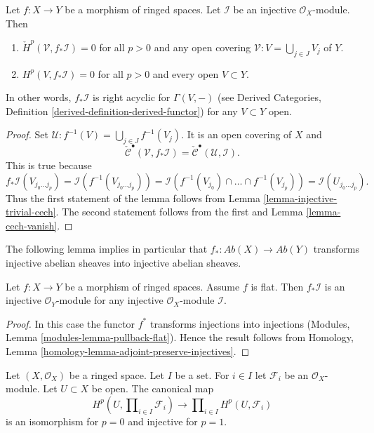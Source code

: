 \begin{lemma}
\label{lemma-pushforward-injective}
Let $f : X \to Y$ be a morphism of ringed spaces.
Let $\mathcal{I}$ be an injective $\mathcal{O}_X$-module.
Then
\begin{enumerate}
\item $\check{H}^p(\mathcal{V}, f_*\mathcal{I}) = 0$
for all $p > 0$ and any open covering
$\mathcal{V} : V = \bigcup_{j \in J} V_j$ of $Y$.
\item $H^p(V, f_*\mathcal{I}) = 0$ for all $p > 0$ and
every open $V \subset Y$.
\end{enumerate}
In other words, $f_*\mathcal{I}$ is right acyclic for $\Gamma(V, -)$
(see
Derived Categories, Definition \ref{derived-definition-derived-functor})
for any $V \subset Y$ open.
\end{lemma}

\begin{proof}
Set $\mathcal{U} : f^{-1}(V) = \bigcup_{j \in J} f^{-1}(V_j)$.
It is an open covering of $X$ and
$$
\check{\mathcal{C}}^\bullet(\mathcal{V}, f_*\mathcal{I}) =
\check{\mathcal{C}}^\bullet(\mathcal{U}, \mathcal{I}).
$$
This is true because
$$
f_*\mathcal{I}(V_{j_0 \ldots j_p})
= \mathcal{I}(f^{-1}(V_{j_0 \ldots j_p})) =
\mathcal{I}(f^{-1}(V_{j_0}) \cap \ldots \cap f^{-1}(V_{j_p}))
= \mathcal{I}(U_{j_0 \ldots j_p}).
$$
Thus the first statement of the lemma follows from
Lemma \ref{lemma-injective-trivial-cech}. The second statement
follows from the first and Lemma \ref{lemma-cech-vanish}.
\end{proof}

\noindent
The following lemma implies in particular that
$f_* : \textit{Ab}(X) \to \textit{Ab}(Y)$ transforms injective
abelian sheaves into injective abelian sheaves.

\begin{lemma}
\label{lemma-pushforward-injective-flat}
Let $f : X \to Y$ be a morphism of ringed spaces.
Assume $f$ is flat.
Then $f_*\mathcal{I}$ is an injective $\mathcal{O}_Y$-module
for any injective $\mathcal{O}_X$-module $\mathcal{I}$.
\end{lemma}

\begin{proof}
In this case the functor $f^*$ transforms injections into injections
(Modules, Lemma \ref{modules-lemma-pullback-flat}).
Hence the result follows from
Homology, Lemma \ref{homology-lemma-adjoint-preserve-injectives}.
\end{proof}

\begin{lemma}
\label{lemma-cohomology-products}
Let $(X, \mathcal{O}_X)$ be a ringed space. Let $I$ be a set.
For $i \in I$ let  $\mathcal{F}_i$ be an $\mathcal{O}_X$-module.
Let $U \subset X$ be open. The canonical map
$$
H^p(U, \prod\nolimits_{i \in I} \mathcal{F}_i)
\longrightarrow
\prod\nolimits_{i \in I} H^p(U, \mathcal{F}_i)
$$
is an isomorphism for $p = 0$ and injective for $p = 1$.
\end{lemma}

